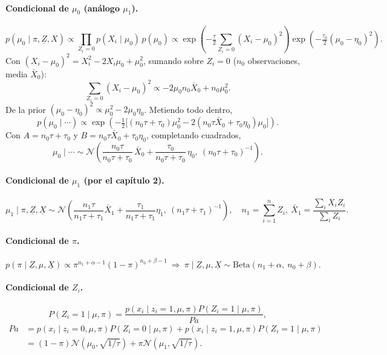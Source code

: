 \documentclass[11pt]{article}
\newcommand{\N}{\mathcal{N}}
\theoremstyle{definition}
\begin{document}
\paragraph{Condicional de $\mu_0$ (análogo $\mu_1$).}
\[
p(\mu_0\mid\pi,\underline Z,X)\propto\prod_{Z_i=0}p(X_i\mid\mu_0)\,p(\mu_0)\propto\exp\!\left(-\tfrac{\tau}{2}\sum_{Z_i=0}(X_i-\mu_0)^2\right)\exp\!\left(-\tfrac{\tau_0}{2}(\mu_0-\eta_0)^2\right).
\]
Con $(X_i-\mu_0)^2=X_i^2-2X_i\mu_0+\mu_0^2$, sumando sobre $Z_i=0$ ($n_0$ observaciones, media $\bar X_0$):
\[
\sum_{Z_i=0}(X_i-\mu_0)^2\propto-2\mu_0 n_0\bar X_0+n_0\mu_0^2.
\]
De la prior $(\mu_0-\eta_0)^2\propto\mu_0^2-2\mu_0\eta_0$. Metiendo todo dentro,
\[
p(\mu_0\mid\cdots)\propto\exp\!\left(-\tfrac12\big[(n_0\tau+\tau_0)\mu_0^2-2(n_0\tau\bar X_0+\tau_0\eta_0)\mu_0\big]\right).
\]
Con $A=n_0\tau+\tau_0$ y $B=n_0\tau\bar X_0+\tau_0\eta_0$, completando cuadrados,
\[
\mu_0\mid\cdots\sim\N\!\left(\frac{n_0\tau}{n_0\tau+\tau_0}\,\bar X_0+\frac{\tau_0}{n_0\tau+\tau_0}\,\eta_0,\ (n_0\tau+\tau_0)^{-1}\right).
\]

\paragraph{Condicional de $\mu_1$ (por el capítulo 2).}
\[
\mu_1\mid\pi,\underline Z,\underline X\sim\N\!\left(\frac{n_1\tau}{n_1\tau+\tau_1}\bar X_1+\frac{\tau_1}{n_1\tau+\tau_1}\eta_1,\ (n_1\tau+\tau_1)^{-1}\right),
\quad n_1=\sum_{i=1}^n Z_i,\ \bar X_1=\frac{\sum_i X_i Z_i}{\sum_i Z_i}.
\]

\paragraph{Condicional de $\pi$.}
\[
p(\pi\mid\underline Z,\mu,\underline X)\propto\pi^{n_1+\alpha-1}(1-\pi)^{n_0+\beta-1}\ \Rightarrow\ \pi\mid\underline Z,\mu,\underline X\sim\text{Beta}(n_1+\alpha,\ n_0+\beta).
\]

\paragraph{Condicional de $Z_i$.}
\[
P(Z_i=1\mid\mu,\pi)=\frac{p(x_i\mid z_i=1,\mu,\pi)P(Z_i=1\mid\mu,\pi)}{Pa},
\]
\begin{align*}
Pa&=p(x_i\mid z_i=0,\mu,\pi)P(Z_i=0\mid\mu,\pi)+p(x_i\mid z_i=1,\mu,\pi)P(Z_i=1\mid\mu,\pi)\\
&=(1-\pi)\N(\mu_0,\sqrt{1/\tau})+\pi\N(\mu_1,\sqrt{1/\tau}).
\end{align*}
\end{document}
